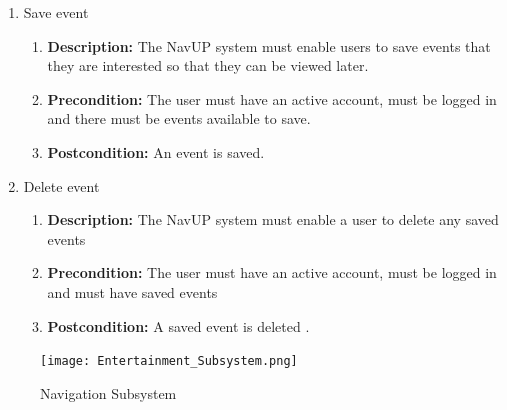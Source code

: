 \documentclass{article}
\begin{document}
\begin{enumerate}
\begin{enumerate}
		\item Save event
		\begin{enumerate}
			\item \textbf{Description:} The NavUP system must enable users to save events that they are interested so that they can be viewed later.
			\item \textbf{Precondition:} The user must have an active account, must be logged in and there must be events available to save.
			\item \textbf{Postcondition:} An event is saved.\newline
		\end{enumerate}
		
		\item Delete event
		\begin{enumerate}
			\item \textbf{Description:} The NavUP system must enable a user to delete any saved events
			\item \textbf{Precondition:} The user must have an active account, must be logged in and must have saved events
			\item \textbf{Postcondition:} A saved event is deleted .\newline
		\end{enumerate}
	\end{enumerate}
	\begin{figure}[h!]
		\texttt{[image: Entertainment\_Subsystem.png]}
		\caption{Navigation Subsystem}	
	\end{figure}	
	

\end{enumerate}
\end{document}
